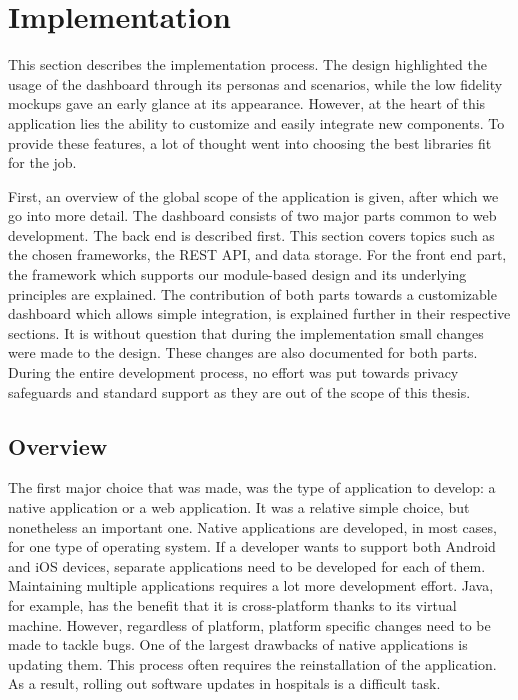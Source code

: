 \section{Implementation} \label{implementation}

This section describes the implementation process. The design highlighted the usage of the dashboard through its personas and scenarios, while the low fidelity mockups gave an early glance at its appearance. However, at the heart of this application lies the ability to customize and easily integrate new components. To provide these features, a lot of thought went into choosing the best libraries fit for the job.

First, an overview of the global scope of the application is given, after which we go into more detail. The dashboard consists of two major parts common to web development. The back end is described first. This section covers topics such as the chosen frameworks, the REST API, and data storage. For the front end part, the framework which supports our module-based design and its underlying principles are explained. The contribution of both parts towards a customizable dashboard which allows simple integration, is explained further in their respective sections. It is without question that during the implementation small changes were made to the design. These changes are also documented for both parts. During the entire development process, no effort was put towards privacy safeguards and standard support as they are out of the scope of this thesis.

    \subsection{Overview}

    The first major choice that was made, was the type of application to develop: a native application or a web application. It was a relative simple choice, but nonetheless an important one. Native applications are developed, in most cases, for one type of operating system. If a developer wants to support both Android and iOS devices, separate applications need to be developed for each of them. Maintaining multiple applications requires a lot more development effort. Java, for example, has the benefit that it is cross-platform thanks to its virtual machine. However, regardless of platform, platform specific changes need to be made to tackle bugs. One of the largest drawbacks of native applications is updating them. This process often requires the reinstallation of the application. As a result, rolling out software updates in hospitals is a difficult task.

